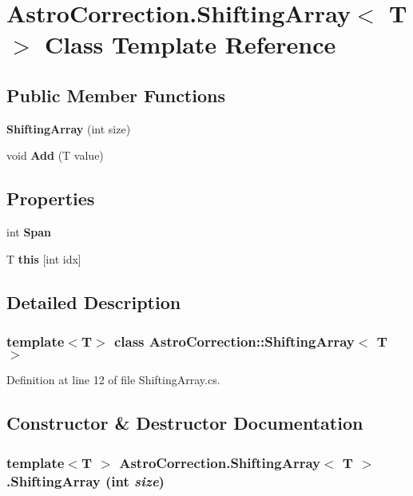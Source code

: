 \section{AstroCorrection.ShiftingArray$<$ T $>$ Class Template Reference}
\label{class_astro_correction_1_1_shifting_array_3_01_t_01_4}
\subsection*{Public Member Functions}
\begin{DoxyCompactItemize}
\item 
{\bf ShiftingArray} (int size)
\item 
void {\bf Add} (T value)
\end{DoxyCompactItemize}
\subsection*{Properties}
\begin{DoxyCompactItemize}
\item 
int {\bf Span}\hspace{0.3cm}{\ttfamily  [get]}
\item 
T {\bf this} [int idx]\hspace{0.3cm}{\ttfamily  [get]}
\end{DoxyCompactItemize}


\subsection{Detailed Description}
\subsubsection*{template$<$T$>$ class AstroCorrection::ShiftingArray$<$ T $>$}



Definition at line 12 of file ShiftingArray.cs.

\subsection{Constructor \& Destructor Documentation}
\subsubsection[{ShiftingArray}]{\setlength{\rightskip}{0pt plus 5cm}template$<$T $>$ AstroCorrection.ShiftingArray$<$ T $>$.ShiftingArray (int {\em size})}\label{class_astro_correction_1_1_shifting_array_3_01_t_01_4_a6bde97c87f3f2c33d906e280f54d9164}


